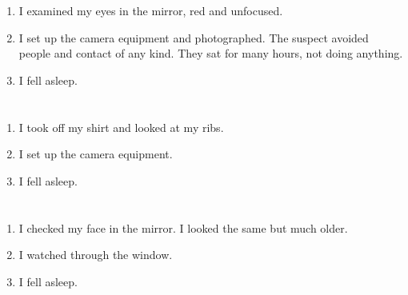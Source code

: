 \documentclass{article}
\begin{document}
    \newpage
    
    \section{}
    
    \begin{enumerate}
    
    \item I examined my eyes in the mirror, red and unfocused.\\
    
    \item I set up the camera equipment and photographed. The suspect avoided people and contact of any kind. They sat for many hours, not doing anything.\\
    
    \item I fell asleep.\\
    
    \end{enumerate}
     
    \newpage
    
    \section{}
    
    \begin{enumerate}
    
    \item I took off my shirt and looked at my ribs.\\
    
    \item I set up the camera equipment.\\
    
    \item I fell asleep.\\
    
    \end{enumerate}
     
    \newpage
    
    \section{}
    
    \begin{enumerate}
    
    \item I checked my face in the mirror. I looked the same but much older.\\
    
    \item I watched through the window.\\
    
    \item I fell asleep.\\
    
    \end{enumerate}
     
\end{document}
